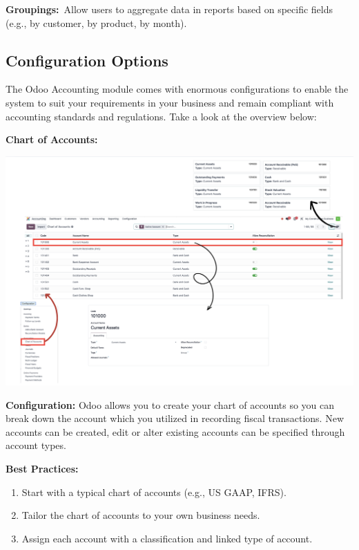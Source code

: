 \documentclass[11pt,a4paper]{article}
\begin{document}
\noindent\textbf{Groupings:} Allow users to aggregate data in reports based on specific fields (e.g., by customer, 
by product, by month).

\subsection{Configuration Options}

\noindent The Odoo Accounting module comes with enormous configurations to enable the system to suit 
your requirements in your business and remain compliant with accounting standards and 
regulations. Take a look at the overview below:
\bigskip

\noindent\textbf{Chart of Accounts:}
\begin{center}
    \includegraphics[width=0.8\linewidth]{diagram/COA.png}
\end{center}

\noindent\textbf{Configuration:} Odoo allows you to create your chart of accounts so you can break down the 
account which you utilized in recording fiscal transactions. New accounts can be created, edit or 
alter existing accounts can be specified through account types.
\medskip

\noindent\textbf{Best Practices:}
\begin{enumerate}
    \item Start with a typical chart of accounts (e.g., US GAAP, IFRS).
    \item Tailor the chart of accounts to your own business needs.
    \item Assign each account with a classification and linked type of account.
\end{enumerate}
\end{document}

